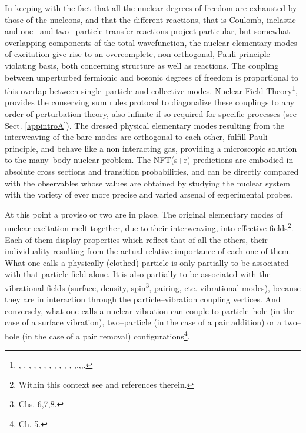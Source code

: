 In keeping with the fact that all the nuclear degrees of freedom are exhausted by those of the nucleons, and that the different reactions, that is Coulomb, inelastic and one-- and two-- particle transfer reactions project particular, but somewhat
 overlapping  components of the total wavefunction, the nuclear elementary modes of excitation give  rise to an overcomplete, non orthogonal, Pauli principle violating basis, both concerning structure as well as reactions. The coupling between unperturbed fermionic and bosonic degrees of freedom is proportional to this overlap between single--particle and collective modes. Nuclear Field Theory\footnote{\cite{Bes:74}, \cite{Bes:76a}, \cite{Bes:76b}, \cite{Bes:76c}, \cite{Bes:75}, \cite{Broglia:76}, \cite{Bes:75b}, \cite{Mottelson:76}, \cite{Bes:77}, \cite{Bortignon:77}, \cite{Bortignon:78}, \cite{Broglia:04a},\cite{Reinhardt:75},\cite{Reinhardt:78a},\cite{Reinhardt:78b},\cite{Reinhardt:80}.}, provides the conserving sum rules protocol to diagonalize these couplings  to any order of perturbation theory, also infinite if so required for specific processes (see Sect. \ref{appintroA}). The dressed physical elementary modes resulting from the interweaving of the bare modes are orthogonal to each other, fulfill Pauli principle, and behave like a non interacting gas, providing a microscopic solution to the many--body nuclear problem. 
 The NFT(s+r) predictions are embodied in absolute cross sections and transition probabilities, and can be directly compared with the observables whose values are obtained by studying the nuclear system with  the variety of ever more precise and varied arsenal of experimental probes. 

At this point a proviso or two are in place. The original elementary modes of nuclear excitation melt together, due to their interweaving, into effective fields\footnote{Within this context see \cite{Dickhoff:05} and references therein.}. Each of them display properties which reflect that of all the others, their individuality resulting from the actual relative importance of each one of them. What one calls a physically  (clothed) particle is only partially to be associated with that particle field alone. It is also partially to be associated with the  vibrational fields
 (surface, density, spin\footnote{\cite{Bertsch:05} Chs. 6,7,8.}, pairing, etc. vibrational modes), 
 because they are in interaction through the particle--vibration coupling vertices. And conversely, what one calls a nuclear vibration can couple to  particle--hole (in the case of a surface vibration),  two--particle (in the case of a pair addition) or a two--hole (in the case of a pair removal)  configurations\footnote{\cite{Brink:05} Ch. 5.}. 
 
